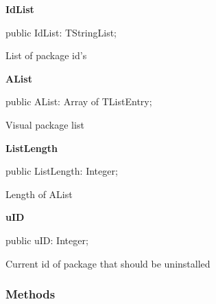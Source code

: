 \documentclass{report}
\newif\ifpdf
\begin{document}
\begin{list}{}
\begin{flushleft}
\ifpdf
\end{flushleft}
\fi


\par  \label{manager.TMnFrm-IdList}
\item[\textbf{IdList}\hfill]
\ifpdf
\begin{flushleft}
\fi
\begin{ttfamily}
public IdList: TStringList;\end{ttfamily}

\ifpdf
\end{flushleft}
\fi


\par List of package id's\label{manager.TMnFrm-AList}
\item[\textbf{AList}\hfill]
\ifpdf
\begin{flushleft}
\fi
\begin{ttfamily}
public AList: Array of TListEntry;\end{ttfamily}

\ifpdf
\end{flushleft}
\fi


\par Visual package list\label{manager.TMnFrm-ListLength}
\item[\textbf{ListLength}\hfill]
\ifpdf
\begin{flushleft}
\fi
\begin{ttfamily}
public ListLength: Integer;\end{ttfamily}

\ifpdf
\end{flushleft}
\fi


\par Length of AList\label{manager.TMnFrm-uID}
\item[\textbf{uID}\hfill]
\ifpdf
\begin{flushleft}
\fi
\begin{ttfamily}
public uID: Integer;\end{ttfamily}

\ifpdf
\end{flushleft}
\fi


\par Current id of package that should be uninstalled\end{list}
\subsubsection*{\large{\textbf{Methods}}\normalsize\hspace{1ex}\hfill}
\end{document}
